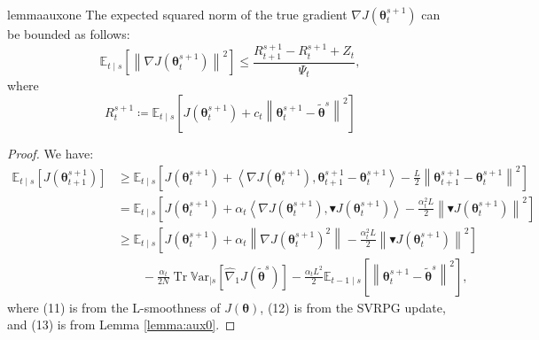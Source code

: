 \documentclass{article}
\theoremstyle{remark}
\theoremstyle{definition}
\DeclareMathOperator{\Tr}{Tr}
\newcommand{\norm}[2][\infty]{\left\|#2\right\|_{#1}}
\newcommand{\dotprod}[2]{\left\langle#1,#2\right\rangle}
\newcommand{\vtheta}{\boldsymbol{\theta}}
\newcommand{\gradJ}[1]{\nabla J(#1)}
\newcommand{\gradApp}[2]{\hat{\nabla}_{#2}J(#1)}
\newcommand{\Ets}[2][t]{\mathbb{E}_{#1\mid s}\left[#2\right]}
\newcommand{\Varts}[2][t]{{\mathbb{V}\text{ar}}_{#1\mid s}\left[#2\right]}
\newcommand{\gradBlack}[1]{\blacktriangledown J(#1)}
\begin{document}
\begin{restatable}[]{lemma}{auxone}\label{lemma:aux1}
The expected squared norm of the true gradient $\gradJ{\vtheta_t^{s+1}}$ can be bounded as follows:
\[
	\Ets{\norm[]{\gradJ{\vtheta_t^{s+1}}}^2} \leq
	\frac{R_{t+1}^{s+1} - R_t^{s+1} + Z_t}{\Psi_t},
\]
	where
\[
	R_t^{s+1}\coloneqq \Ets{J(\vtheta_t^{s+1}) + c_t\norm[]{\vtheta_t^{s+1}-\tilde{\vtheta}^s}^2}
\]
\end{restatable}
\begin{proof}
	We have:
	\begin{align}
	\Ets{J(\vtheta_{t+1}^{s+1})} 
	&\geq \Ets{J(\vtheta_t^{s+1})+\dotprod{\gradJ{\vtheta_t^{s+1}}}{\vtheta_{t+1}^{s+1}-\vtheta_t^{s+1}} - \frac{L}{2}\norm[]{\vtheta_{t+1}^{s+1}-\vtheta_t^{s+1}}^2} \\
	&= \Ets{J(\vtheta_t^{s+1})+\alpha_t\dotprod{\gradJ{\vtheta_t^{s+1}}}{\gradBlack{\vtheta_t^{s+1}}} - \frac{\alpha_t^2L}{2}\norm[]{\gradBlack{\vtheta_t^{s+1}}}^2} \\
	&\geq
	\Ets{J(\vtheta_t^{s+1})+\alpha_t\norm[]{\gradJ{\vtheta_t^{s+1}}^2} - \frac{\alpha_t^2L}{2}\norm[]{\gradBlack{\vtheta_t^{s+1}}}^2} \nonumber\\
	&\qquad-
	\frac{\alpha_t}{2N}\Tr\Varts[]{\gradApp{\tilde{\vtheta}^s}{1}} -\frac{\alpha_tL^2}{2}\Ets[t-1]{\norm[]{\vtheta_t^{s+1} - \tilde{\vtheta}^s}^2},
\end{align}
where (11) is from the L-smoothness of $J(\vtheta)$, (12) is from the SVRPG update, and (13) is from Lemma \ref{lemma:aux0}.


\end{proof}
\end{document}
